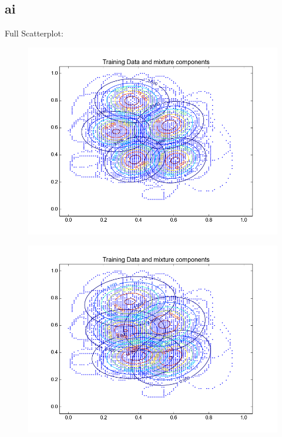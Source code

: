 \documentclass[11pt,a4paper]{article}
\begin{document}
\subsection{ai}
Full Scatterplot: \\
\begin{minipage}[b]{0.25\textwidth}
\begin{figure}[H]
  \centering
  \includegraphics[width=.8\linewidth]{Figures/contours_ai.test0.png}
  \label{fig:sfig1}
\end{figure}%
\end{minipage}
\begin{minipage}[b]{0.25\textwidth}
\begin{figure}[H]
  \centering
  \includegraphics[width=.8\linewidth]{Figures/contours_ai.test5.png}

  \label{fig:sfig1}
\end{figure}%
\end{minipage}
\end{document}
